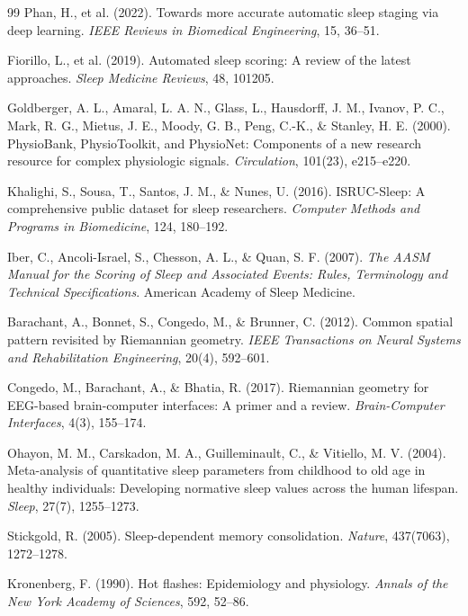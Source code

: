 \documentclass[ASNA,twocolumn]{USG}
\begin{document}
\begin{thebibliography}{99}
 Phan, H., et al. (2022). Towards more accurate automatic sleep staging via deep learning. \textit{IEEE Reviews in Biomedical Engineering}, 15, 36--51.

 Fiorillo, L., et al. (2019). Automated sleep scoring: A review of the latest approaches. \textit{Sleep Medicine Reviews}, 48, 101205.

 Goldberger, A. L., Amaral, L. A. N., Glass, L., Hausdorff, J. M., Ivanov, P. C., Mark, R. G., Mietus, J. E., Moody, G. B., Peng, C.-K., \& Stanley, H. E. (2000). PhysioBank, PhysioToolkit, and PhysioNet: Components of a new research resource for complex physiologic signals. \textit{Circulation}, 101(23), e215--e220.

 Khalighi, S., Sousa, T., Santos, J. M., \& Nunes, U. (2016). ISRUC-Sleep: A comprehensive public dataset for sleep researchers. \textit{Computer Methods and Programs in Biomedicine}, 124, 180--192.

 Iber, C., Ancoli-Israel, S., Chesson, A. L., \& Quan, S. F. (2007). \textit{The AASM Manual for the Scoring of Sleep and Associated Events: Rules, Terminology and Technical Specifications}. American Academy of Sleep Medicine.

 Barachant, A., Bonnet, S., Congedo, M., \& Brunner, C. (2012). Common spatial pattern revisited by Riemannian geometry. \textit{IEEE Transactions on Neural Systems and Rehabilitation Engineering}, 20(4), 592--601.

 Congedo, M., Barachant, A., \& Bhatia, R. (2017). Riemannian geometry for EEG-based brain-computer interfaces: A primer and a review. \textit{Brain-Computer Interfaces}, 4(3), 155--174.

 Ohayon, M. M., Carskadon, M. A., Guilleminault, C., \& Vitiello, M. V. (2004). Meta-analysis of quantitative sleep parameters from childhood to old age in healthy individuals: Developing normative sleep values across the human lifespan. \textit{Sleep}, 27(7), 1255--1273.

 Stickgold, R. (2005). Sleep-dependent memory consolidation. \textit{Nature}, 437(7063), 1272--1278.

 Kronenberg, F. (1990). Hot flashes: Epidemiology and physiology. \textit{Annals of the New York Academy of Sciences}, 592, 52--86.


\end{thebibliography}
\end{document}
